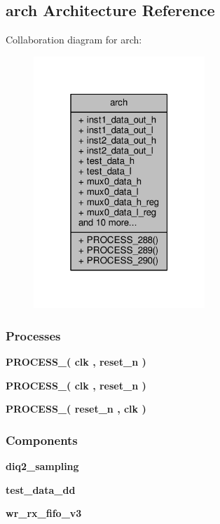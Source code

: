 \subsection{arch Architecture Reference}
\label{classdiq2__samples_1_1arch}


Collaboration diagram for arch\+:\nopagebreak
\begin{figure}[H]
\begin{center}
\leavevmode
\includegraphics[width=183pt]{d9/d99/classdiq2__samples_1_1arch__coll__graph}
\end{center}
\end{figure}
\subsubsection*{Processes}
 \begin{DoxyCompactItemize}
\item 
{\bf P\+R\+O\+C\+E\+S\+S\+\_}{\bfseries  ( {\bfseries {\bfseries {\bf clk}} \textcolor{vhdlchar}{ }} , {\bfseries {\bfseries {\bf reset\+\_\+n}} \textcolor{vhdlchar}{ }} )}
\item 
{\bf P\+R\+O\+C\+E\+S\+S\+\_}{\bfseries  ( {\bfseries {\bfseries {\bf clk}} \textcolor{vhdlchar}{ }} , {\bfseries {\bfseries {\bf reset\+\_\+n}} \textcolor{vhdlchar}{ }} )}
\item 
{\bf P\+R\+O\+C\+E\+S\+S\+\_}{\bfseries  ( {\bfseries {\bfseries {\bf reset\+\_\+n}} \textcolor{vhdlchar}{ }} , {\bfseries {\bfseries {\bf clk}} \textcolor{vhdlchar}{ }} )}
\end{DoxyCompactItemize}
\subsubsection*{Components}
 \begin{DoxyCompactItemize}
\item 
{\bf diq2\+\_\+sampling}  {\bfseries }  
\item 
{\bf test\+\_\+data\+\_\+dd}  {\bfseries }  
\item 
{\bf wr\+\_\+rx\+\_\+fifo\+\_\+v3}  {\bfseries }  
\end{DoxyCompactItemize}
